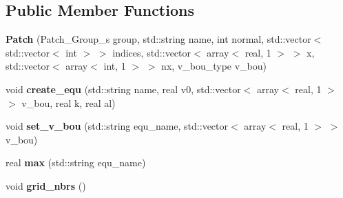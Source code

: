 \subsection*{Public Member Functions}
\begin{DoxyCompactItemize}
\item 
\hypertarget{classPatch_a7adac62309652817919b4e508782566d}{{\bfseries Patch} (Patch\-\_\-\-Group\-\_\-s group, std\-::string name, int normal, std\-::vector$<$ std\-::vector$<$ int $>$ $>$ indices, std\-::vector$<$ array$<$ real, 1 $>$ $>$ x, std\-::vector$<$ array$<$ int, 1 $>$ $>$ nx, v\-\_\-bou\-\_\-type v\-\_\-bou)}\label{classPatch_a7adac62309652817919b4e508782566d}

\item 
\hypertarget{classPatch_ac8352cc930b37975da9627262540cebd}{void {\bfseries create\-\_\-equ} (std\-::string name, real v0, std\-::vector$<$ array$<$ real, 1 $>$ $>$ v\-\_\-bou, real k, real al)}\label{classPatch_ac8352cc930b37975da9627262540cebd}

\item 
\hypertarget{classPatch_af0311eccfd4f4fd356785f7b23dc8fa2}{void {\bfseries set\-\_\-v\-\_\-bou} (std\-::string equ\-\_\-name, std\-::vector$<$ array$<$ real, 1 $>$ $>$ v\-\_\-bou)}\label{classPatch_af0311eccfd4f4fd356785f7b23dc8fa2}

\item 
\hypertarget{classPatch_aa0a6036ed90bf4a98cc498f925fb530d}{real {\bfseries max} (std\-::string equ\-\_\-name)}\label{classPatch_aa0a6036ed90bf4a98cc498f925fb530d}

\item 
\hypertarget{classPatch_ae57b4223cce6c1ed9dbaaa5080a2501a}{void {\bfseries grid\-\_\-nbrs} ()}\label{classPatch_ae57b4223cce6c1ed9dbaaa5080a2501a}

\end{DoxyCompactItemize}

